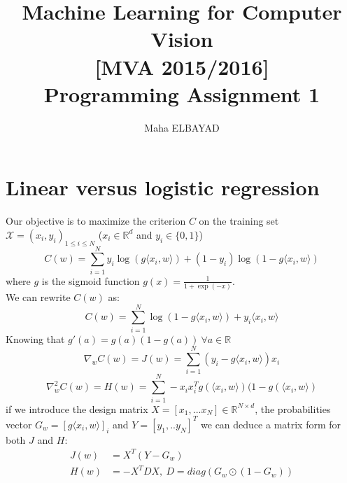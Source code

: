 \documentclass{acmsiggraph}
\title{Machine Learning for Computer Vision\\ {\large [MVA 2015/2016]}\\
\vspace{10pt}
Programming Assignment 1}
\author{Maha ELBAYAD
}
\newcommand{\R}{\mathbb{R}}
\begin{document}
\maketitle

\section{Linear versus logistic regression}
Our objective is to maximize the criterion $C$ on the training set $\mathcal X = {(x_i,y_i)}_{1\leq i\leq N}$  ($x_i\in\R^d$ and $y_i\in\{0,1\}$)
\[C(w) = \sum_{i=1}^Ny_i\log\left(g\langle x_i,w\rangle\right)+(1 - y_i)\log\left(1-g\langle x_i,w\rangle\right)\]
where $g$ is the sigmoid function $g(x) = \frac{1}{1+\exp(-x)}$.\\
We can rewrite $C(w)$ as:
\[C(w) = \sum_{i=1}^N\log(1-g\langle x_i,w\rangle) + y_i \langle x_i,w\rangle\]
Knowing that $g'(a) = g(a)(1-g(a))\:\forall a\in\R$
\[\nabla_wC(w) = J(w) =\sum_{i=1}^N(y_i-g\langle x_i,w\rangle)x_i \]
\[\nabla_w^2C(w)= H(w) = \sum_{i=1}^N -x_ix_i^Tg(\langle x_i,w\rangle)(1-g(\langle x_i,w\rangle)\]
if we introduce the design matrix $X = [x_1,...x_N]\in\R^{N\times d}$, the probabilities vector $G_w=[g\langle x_i,w\rangle]_i$ and $Y=[y_1,..y_N]^T$ we can deduce a matrix form for both $J$ and $H$:
\[\begin{split}
J(w) & = X^T(Y-G_w)\\
H(w) & = -X^TDX,\:D = diag(G_w\odot(1-G_w)) \\
\end{split}\]
\end{document}
